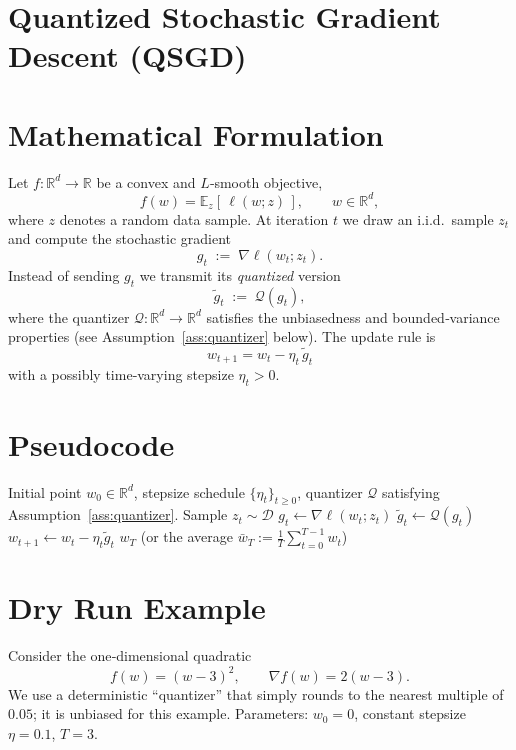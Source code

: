 \documentclass{article}
\newcommand{\E}{\mathbb{E}}
\newcommand{\R}{\mathbb{R}}
\newcommand{\Q}{\mathcal{Q}}
\begin{document}
\section*{Quantized Stochastic Gradient Descent (QSGD)}

\section*{Mathematical Formulation}
Let $f:\R^{d}\rightarrow\R$ be a convex and $L$‑smooth objective,
\[
f(w)=\E_{z}[\,\ell(w;z)\,],\qquad w\in\R^{d},
\]
where $z$ denotes a random data sample.  
At iteration $t$ we draw an i.i.d.\ sample $z_{t}$ and compute the stochastic gradient
\[
g_{t}\;:=\;\nabla\ell(w_{t};z_{t}) .
\]
Instead of sending $g_{t}$ we transmit its \emph{quantized} version
\[
\tilde g_{t}\;:=\;\Q(g_{t}),
\]
where the quantizer $\Q:\R^{d}\rightarrow\R^{d}$ satisfies the unbiasedness and bounded‑variance
properties (see Assumption~\ref{ass:quantizer} below).  
The update rule is
\begin{equation}
\boxed{\,w_{t+1}=w_{t}-\eta_{t}\,\tilde g_{t}\,}\tag{1}
\end{equation}
with a possibly time‑varying stepsize $\eta_{t}>0$.

\section*{Pseudocode}
\begin{algorithm}[H]
\caption{Quantized SGD}
\begin{algorithmic}[1]
\Require Initial point $w_{0}\in\R^{d}$, stepsize schedule $\{\eta_{t}\}_{t\ge 0}$,
      quantizer $\Q$ satisfying Assumption~\ref{ass:quantizer}.
    \State Sample $z_{t}\sim\mathcal{D}$ 
    \State $g_{t}\gets\nabla\ell(w_{t};z_{t})$
    \State $\tilde g_{t}\gets \Q(g_{t})$ 
    \State $w_{t+1}\gets w_{t}-\eta_{t}\tilde g_{t}$
\EndFor
\State \Return $w_{T}$ (or the average $\bar w_{T}:=\frac1T\sum_{t=0}^{T-1}w_{t}$)
\end{algorithmic}
\end{algorithm}

\section*{Dry Run Example}
Consider the one‑dimensional quadratic
\[
f(w)=(w-3)^{2},\qquad \nabla f(w)=2(w-3).
\]
We use a deterministic ``quantizer'' that simply rounds to the nearest multiple of $0.05$; it is unbiased for this example.  
Parameters: $w_{0}=0$, constant stepsize $\eta=0.1$, $T=3$.
\end{document}

